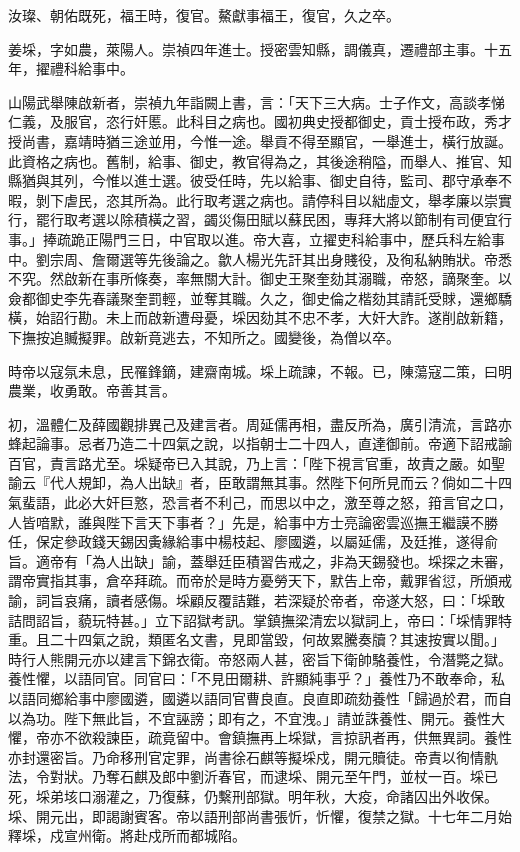 \begin{pinyinscope}
汝璨、朝佑既死，福王時，復官。鰲獻事福王，復官，久之卒。

姜埰，字如農，萊陽人。崇禎四年進士。授密雲知縣，調儀真，遷禮部主事。十五年，擢禮科給事中。

山陽武舉陳啟新者，崇禎九年詣闕上書，言：「天下三大病。士子作文，高談孝悌仁義，及服官，恣行奸慝。此科目之病也。國初典史授都御史，貢士授布政，秀才授尚書，嘉靖時猶三途並用，今惟一途。舉貢不得至顯官，一舉進士，橫行放誕。此資格之病也。舊制，給事、御史，教官得為之，其後途稍隘，而舉人、推官、知縣猶與其列，今惟以進士選。彼受任時，先以給事、御史自待，監司、郡守承奉不暇，剝下虐民，恣其所為。此行取考選之病也。請停科目以絀虛文，舉孝廉以崇實行，罷行取考選以除積橫之習，蠲災傷田賦以蘇民困，專拜大將以節制有司便宜行事。」捧疏跪正陽門三日，中官取以進。帝大喜，立擢吏科給事中，歷兵科左給事中。劉宗周、詹爾選等先後論之。歙人楊光先訐其出身賤役，及徇私納賄狀。帝悉不究。然啟新在事所條奏，率無關大計。御史王聚奎劾其溺職，帝怒，謫聚奎。以僉都御史李先春議聚奎罰輕，並奪其職。久之，御史倫之楷劾其請託受賕，還鄉驕橫，始詔行勘。未上而啟新遭母憂，埰因劾其不忠不孝，大奸大詐。遂削啟新籍，下撫按追贓擬罪。啟新竟逃去，不知所之。國變後，為僧以卒。

時帝以寇氛未息，民罹鋒鏑，建齋南城。埰上疏諫，不報。已，陳蕩寇二策，曰明農業，收勇敢。帝善其言。

初，溫體仁及薛國觀排異己及建言者。周延儒再相，盡反所為，廣引清流，言路亦蜂起論事。忌者乃造二十四氣之說，以指朝士二十四人，直達御前。帝適下詔戒諭百官，責言路尤至。埰疑帝已入其說，乃上言：「陛下視言官重，故責之嚴。如聖諭云『代人規卸，為人出缺』者，臣敢謂無其事。然陛下何所見而云？倘如二十四氣蜚語，此必大奸巨憝，恐言者不利己，而思以中之，激至尊之怒，箝言官之口，人皆喑默，誰與陛下言天下事者？」先是，給事中方士亮論密雲巡撫王繼謨不勝任，保定參政錢天錫因夤緣給事中楊枝起、廖國遴，以屬延儒，及廷推，遂得俞旨。適帝有「為人出缺」諭，蓋舉廷臣積習告戒之，非為天錫發也。埰探之未審，謂帝實指其事，倉卒拜疏。而帝於是時方憂勞天下，默告上帝，戴罪省愆，所頒戒諭，詞旨哀痛，讀者感傷。埰顧反覆詰難，若深疑於帝者，帝遂大怒，曰：「埰敢詰問詔旨，藐玩特甚。」立下詔獄考訊。掌鎮撫梁清宏以獄詞上，帝曰：「埰情罪特重。且二十四氣之說，類匿名文書，見即當毀，何故累騰奏牘？其速按實以聞。」時行人熊開元亦以建言下錦衣衛。帝怒兩人甚，密旨下衛帥駱養性，令潛斃之獄。養性懼，以語同官。同官曰：「不見田爾耕、許顯純事乎？」養性乃不敢奉命，私以語同鄉給事中廖國遴，國遴以語同官曹良直。良直即疏劾養性「歸過於君，而自以為功。陛下無此旨，不宜誣謗；即有之，不宜洩。」請並誅養性、開元。養性大懼，帝亦不欲殺諫臣，疏竟留中。會鎮撫再上埰獄，言掠訊者再，供無異詞。養性亦封還密旨。乃命移刑官定罪，尚書徐石麒等擬埰戍，開元贖徒。帝責以徇情骫法，令對狀。乃奪石麒及郎中劉沂春官，而逮埰、開元至午門，並杖一百。埰已死，埰弟垓口溺灌之，乃復蘇，仍繫刑部獄。明年秋，大疫，命諸囚出外收保。埰、開元出，即謁謝賓客。帝以語刑部尚書張忻，忻懼，復禁之獄。十七年二月始釋埰，戍宣州衛。將赴戍所而都城陷。


\end{pinyinscope}
